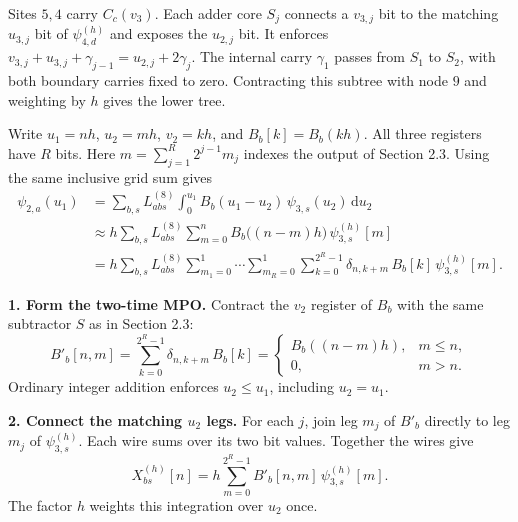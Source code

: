 \documentclass[11pt,a4paper]{article}
\newcommand{\subhead}[1]{\par\Needspace{4\baselineskip}\smallskip{\large\sffamily\bfseries\color{DeepBlue}#1\par}}
\newcommand{\note}[1]{{\small #1\par}}
\begin{document}
\begin{minipage}{\linewidth}
\begin{center}
\end{center}
\note{Sites \(5,4\) carry \(C_c(v_3)\). Each adder core \(S_j\) connects a \(v_{3,j}\) bit to the matching \(u_{3,j}\) bit of \(\psi_{4,d}^{(h)}\) and exposes the \(u_{2,j}\) bit. It enforces \(v_{3,j}+u_{3,j}+\gamma_{j-1}=u_{2,j}+2\gamma_j\). The internal carry \(\gamma_1\) passes from \(S_1\) to \(S_2\), with both boundary carries fixed to zero. Contracting this subtree with node \(9\) and weighting by \(h\) gives the lower tree.}
\end{minipage}\par
{}
\subhead{2.4\quad Express \(\psi_{2,a}(u_1)\) in terms of \(\psi_{3,s}(u_2)\)}
Write \(u_1=nh\), \(u_2=mh\), \(v_2=kh\), and \(B_b[k]=B_b(kh)\).
All three registers have \(R\) bits. Here \(m=\sum_{j=1}^R2^{j-1}m_j\)
indexes the output of Section 2.3. Using the same inclusive grid sum gives
\[
\begin{aligned}
 \psi_{2,a}(u_1)
 &=\sum_{b,s}L^{(8)}_{abs}\int_0^{u_1}
 B_b(u_1-u_2)\,\psi_{3,s}(u_2)\,\mathrm{d}u_2\\
 &\approx h\sum_{b,s}L^{(8)}_{abs}\sum_{m=0}^{n}
 B_b\bigl((n-m)h\bigr)\,\psi_{3,s}^{(h)}[m]\\
 &= h\sum_{b,s}L^{(8)}_{abs}
 \sum_{m_1=0}^1\cdots\sum_{m_R=0}^1\sum_{k=0}^{2^R-1}
 \delta_{n,k+m}\,B_b[k]\,\psi_{3,s}^{(h)}[m].
\end{aligned}
\]

\textbf{1. Form the two-time MPO.}
Contract the \(v_2\) register of \(B_b\) with the same subtractor \(S\) as in Section 2.3:
\[
 B'_b[n,m]=\sum_{k=0}^{2^R-1}\delta_{n,k+m}\,B_b[k]
 =\begin{cases} B_b((n-m)h),&m\le n,\\0,&m>n.\end{cases}
\]
Ordinary integer addition enforces \(u_2\le u_1\), including \(u_2=u_1\).

\textbf{2. Connect the matching \(u_2\) legs.}
For each \(j\), join leg \(m_j\) of \(B'_b\) directly to leg \(m_j\) of
\(\psi_{3,s}^{(h)}\). Each wire sums over its two bit values. Together the wires give
\[
 X_{bs}^{(h)}[n]=h\sum_{m=0}^{2^R-1}B'_b[n,m]\,\psi_{3,s}^{(h)}[m].
\]
The factor \(h\) weights this integration over \(u_2\) once.
\end{document}
